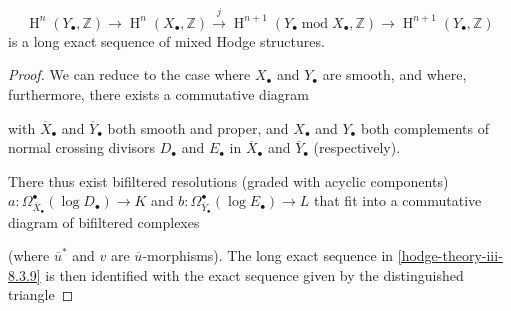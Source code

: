     \[       \operatorname {H}^n(Y_\bullet ,\mathbb {Z})       \to  \operatorname {H}^n(X_\bullet ,\mathbb {Z})       \xrightarrow {j} \operatorname {H}^{n+1}(Y_\bullet \operatorname {mod} X_\bullet ,\mathbb {Z})       \to  \operatorname {H}^{n+1}(Y_\bullet ,\mathbb {Z})     \]
    is a long exact sequence of mixed Hodge structures.\begin{proof}\par{}We can reduce to the case where \(X_\bullet \) and \(Y_\bullet \) are smooth, and where, furthermore, there exists a commutative diagram
      

      with \(\overline {X}_\bullet \) and \(\overline {Y}_\bullet \) both smooth and proper, and \(X_\bullet \) and \(Y_\bullet \) both complements of normal crossing divisors \(D_\bullet \) and \(E_\bullet \) in \(\overline {X}_\bullet \) and \(\overline {Y}_\bullet \) (respectively).\par{}There thus exist bifiltered resolutions (graded with acyclic components) \(a\colon \Omega _{\overline {X}_\bullet }^\bullet (\log  D_\bullet )\to  K\) and \(b\colon \Omega _{\overline {Y}_\bullet }^\bullet (\log  E_\bullet )\to  L\) that fit into a commutative diagram of bifiltered complexes
      

      (where \(\overline {u}^*\) and \(v\) are \(\overline {u}\)-morphisms).
      The long exact sequence in \cref{hodge-theory-iii-8.3.9} is then identified with the exact sequence given by the distinguished triangle
      


\end{proof}
